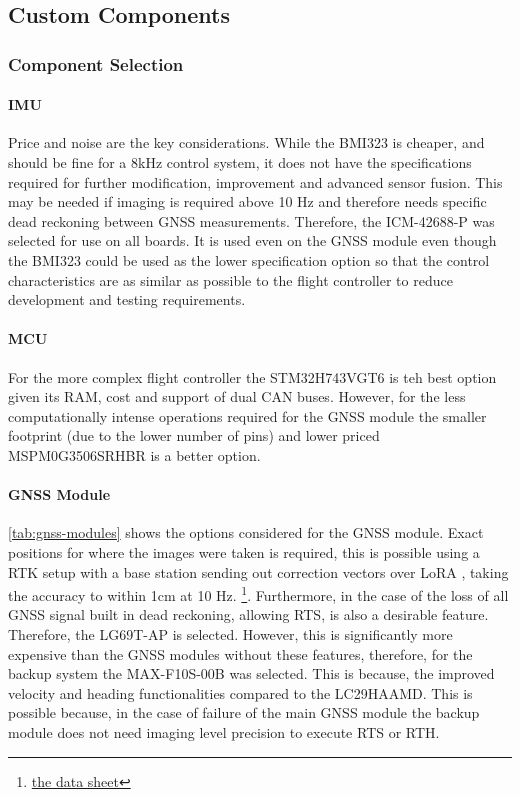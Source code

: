 \subsection{Custom Components}

\subsubsection{Component Selection}

\paragraph{\gls{IMU}}
Price and noise are the key considerations. While the BMI323 is cheaper, and should be fine for a 8kHz control system, it does not have the specifications required for further modification, improvement and advanced sensor fusion. This may be needed if imaging is required above 10 Hz and therefore needs specific dead reckoning between \gls{GNSS} measurements. Therefore, the ICM-42688-P was selected for use on all boards. It is used even on the \gls{GNSS} module even though the BMI323 could be used as the lower specification option so that the control characteristics are as similar as possible to the flight controller to reduce development and testing requirements.
\paragraph{\gls{MCU}}
For the more complex flight controller the STM32H743VGT6 is teh best option given its \gls{RAM}, cost and support of dual \gls{CAN} buses. However, for the less computationally intense operations required for the \gls{GNSS} module the smaller footprint (due to the lower number of pins) and lower priced MSPM0G3506SRHBR is a better option.
\paragraph{\gls{GNSS} Module}
\ref{tab:gnss-modules} shows the options considered for the \gls{GNSS} module. Exact positions for where the images were taken is required, this is possible using a \gls{RTK} setup with a base station sending out correction vectors over LoRA \cite{a source}, taking the accuracy to within 1cm at 10 Hz. \footnote{\url{the data sheet}}. Furthermore, in the case of the loss of all \gls{GNSS} signal built in dead reckoning, allowing \gls{RTS}, is also a desirable feature. Therefore, the LG69T-AP is selected. However, this is significantly more expensive than the \gls{GNSS} modules without these features, therefore, for the backup system the MAX-F10S-00B was selected. This is because, the improved velocity and heading functionalities compared to the LC29HAAMD. This is possible because, in the case of failure of the main \gls{GNSS} module the backup module does not need imaging level precision to execute \gls{RTS} or \gls{RTH}.
